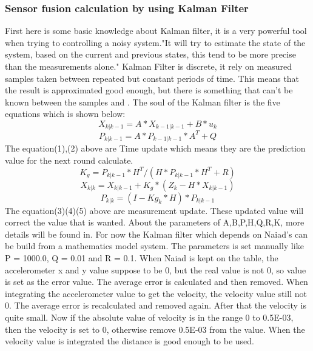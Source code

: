 		\subsubsection*{Sensor fusion calculation by using Kalman Filter}
		\noindent
		First here is some basic knowledge about Kalman filter, it is a very powerful tool when trying to controlling a noisy system\cite{kalman_filter}."It will try to estimate the state of the system, based on the current and previous states, this tend to be more precise than the measurements alone."\cite{TKJ} Kalman Filter is discrete, it rely on measured samples taken between repeated but constant periods of time. This means that the result is approximated good enough, but there is something that can't be known between the samples\cite{Greg_Czerniaks_Website} and \cite{change_parameter}. The soul of the Kalman filter is the five equations which is shown below:
\begin{equation}
	X_{k|k-1} = A*X_{k-1|k-1} +B*u_{k}
\end{equation}
\begin{equation}
	P_{k|k-1} = A*P_{k-1|k-1}*A^{T} + Q
\end{equation}
The equation(1),(2) above are Time update which means they are the prediction value for the next round calculate.
\begin{equation}
K_{g} = P_{k|k-1}*H^{T}/(H*P_{k|k-1}*H^{T}+R)
\end{equation}
\begin{equation}
	X_{k|k} = X_{k|k-1} +K_{g}*(Z_{k}-H*X_{k|k-1})
\end{equation}
\begin{equation}
P_{k|k}=(I-Kg_{k}* H)*P_{k|k-1}
\end{equation}
 The equation(3)(4)(5) above are measurement update. These updated value will correct the value that is wanted\cite{kalman_filter_dummies}. About the parameters of A,B,P,H,Q,R,K, more details will be found in\cite{parameter}.
 For now the Kalman filter which depends on Naiad's can be build from a mathematics model system. The parameters is set manually like P = 1000.0, Q = 0.01 and R = 0.1. When Naiad is kept on the table, the accelerometer x and y value suppose to be 0, but the real value is not 0, so value is set as the error value. The average error is calculated and then removed. When integrating the accelerometer value to get the velocity, the velocity value still not 0. The average error is recalculated and removed again. After that the velocity is quite small. Now if the absolute value of velocity is in the range 0 to 0.5E-03, then the velocity is set to 0, otherwise remove 0.5E-03 from the value. When the velocity value is integrated the distance is good enough to be used.

